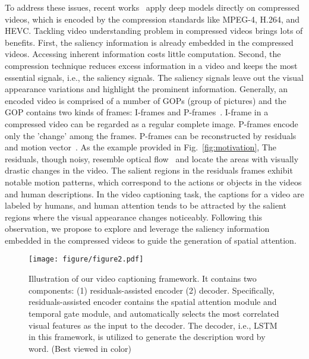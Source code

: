 \documentclass[a4paper,conference]{IEEEtran}
\begin{document}
To address these issues, recent works~\cite{wu2018compressed, shou2019dmc, wang2019fast} apply deep models directly on compressed videos, which is encoded by the compression standards like MPEG-4, H.264, and HEVC. Tackling video understanding problem in compressed videos brings lots of benefits. First, the saliency information is already embedded in the compressed videos. Accessing inherent information costs little computation. Second, the compression technique reduces excess information in a video and keeps the most essential signals, i.e., the saliency signals. The saliency signals leave out the visual appearance variations and highlight the prominent information.
Generally, an encoded video is comprised of a number of GOPs (group of pictures) and the GOP contains two kinds of frames: I-frames and P-frames~\cite{wu2018compressed, shou2019dmc, wang2019fast}. I-frame in a compressed video can be regarded as a regular complete image. P-frames encode only the 'change' among the frames. P-frames can be reconstructed by residuals and motion vector~\cite{wang2019fast}. As the example provided in Fig.~\ref{fig:motivation}, The residuals, though noisy, resemble optical flow~\cite{sun2018optical} and locate the areas with visually drastic changes in the video. The salient regions in the residuals frames exhibit notable motion patterns, which correspond to the actions or objects in the videos and human descriptions. In the video captioning task, the captions for a video are labeled by humans, and human attention tends to be attracted by the salient regions where the visual appearance changes noticeably. Following this observation, we propose to explore and leverage the saliency information embedded in the compressed videos to guide the generation of spatial attention.


\begin{figure*}[!htb]
\centering
\texttt{[image: figure/figure2.pdf]}

\caption{Illustration of our video captioning framework. It contains two components: (1) residuals-assisted encoder (2) decoder. Specifically, residuals-assisted encoder contains the spatial attention module and temporal gate module, and automatically selects the most correlated visual features as the input to the decoder. The decoder, i.e., LSTM in this framework, is utilized to generate the description word by word.
(Best viewed in color)}

\label{fig:framework}
\end{figure*}
\end{document}
